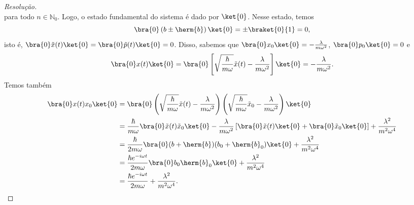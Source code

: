 \begin{proof}[Resolução]
\begin{equation*}
    \end{equation*}
    para todo \(n \in \mathbb{N}_0\). Logo, o estado fundamental do sistema é dado por \(\ket{0}\). Nesse estado, temos
    \begin{equation*}
        \bra{0} \left(b \pm  \herm{b}\right) \ket{0} = \pm \braket{0}{1} = 0,
    \end{equation*}
    isto é, \(\bra{0}\tilde{x}(t)\ket{0} = \bra{0}\tilde{p}(t)\ket{0} = 0\). Disso, sabemos que \(\bra{0}x_0\ket{0} = - \frac{\lambda}{m \omega^2}\), \(\bra{0} p_0\ket{0} = 0\) e
    \begin{equation*}
        \bra{0}x(t)\ket{0} = \bra{0}\left[\sqrt{\frac\hbar{m \omega}} \tilde{x}(t) - \frac{\lambda}{m \omega^2}\right]\ket{0} = - \frac{\lambda}{m \omega^2}.
    \end{equation*}
    Temos também
    \begin{align*}
        \bra{0}x(t)x_0\ket{0} &= \bra{0}\left(\sqrt{\frac{\hbar}{m \omega}} \tilde{x}(t) - \frac{\lambda}{m \omega^2}\right)\left(\sqrt{\frac{\hbar}{m \omega}} \tilde{x}_0 - \frac{\lambda}{m \omega^2}\right)\ket{0}\\
                              &= \frac{\hbar}{m \omega} \bra{0} \tilde{x}(t) \tilde{x}_0 \ket{0} -\frac{\lambda}{m\omega^2} \left[\bra{0}\tilde{x}(t)\ket{0}+ \bra{0}\tilde{x}_0\ket{0}\right] + \frac{\lambda^2}{m^2 \omega^4}\\
                              &= \frac{\hbar}{2m \omega} \bra{0}(b + \herm{b})(b_0 + \herm{b}_0)\ket{0} + \frac{\lambda^2}{m^2 \omega^4}\\
                              &= \frac{\hbar e^{-i \omega t}}{2m \omega} \bra{0} b_0 \herm{b}_0 \ket{0} + \frac{\lambda^2}{m^2 \omega^4}\\
                              &= \frac{\hbar e^{-i \omega t}}{2 m \omega} + \frac{\lambda^2}{m^2 \omega^4}.
    \end{align*}


\end{proof}
